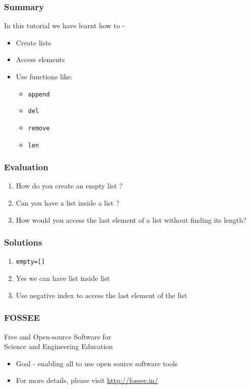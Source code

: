 \documentclass[17pt,compress]{beamer}
\begin{document}
\begin{frame}[fragile]
	\frametitle{Summary}
	In this tutorial we have learnt how to -
    \begin{itemize}
        \item Create lists
        \item Access elements
        \item Use functions like:
        	\begin{itemize}
        	\item \texttt{append} 
        	\item \texttt{del} 
        	\item \texttt{remove} 
        	\item \texttt{len}    	
        	\end{itemize}

	\end{itemize}
\end{frame}
\begin{frame}[fragile]
	\frametitle{Evaluation}
	\begin{enumerate}
        \item How do you create an empty list ?\pause
        \vspace{8pt}
        \item Can you have a list inside a list ?\pause
        \vspace{8pt}
        \item How would you access the last element of a list without finding its length?
    \end{enumerate}
\end{frame}
\begin{frame}[fragile]
	\frametitle{Solutions}
	\begin{enumerate}
        \item \texttt{empty=[]}\pause
        \vspace{8pt}
        \item Yes we can have list inside list\\\pause
        \vspace{8pt}
        \item Use negative index to access the last element of the list
    \end{enumerate}
\end{frame}
\begin{frame}
\frametitle{FOSSEE}
{\color{blue}Free and Open-source Software for \\Science and Engineering Education} \\
\begin{itemize}
\item Goal - enabling all to use open source software tools
\item For more details, please visit {\color{blue}\url{http://fossee.in/}}
\end{itemize}
\end{frame}
\end{document}
